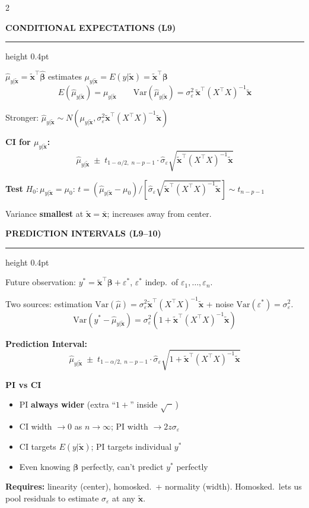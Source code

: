 \documentclass[7pt]{extarticle}
\newcommand{\msection}[1]{%
  \vspace{4pt}%
  {\small\bfseries\color{blue!70!black}\MakeUppercase{#1}}%
  \vspace{1pt}%
  \par\nobreak%
  {\color{blue!70!black}\hrule height 0.4pt}%
  \vspace{2pt}\par\nobreak%
}
\newcommand{\msubsection}[1]{%
  \vspace{2pt}%
  {\footnotesize\bfseries\color{purple!70!black}#1}%
  \vspace{1pt}\par\nobreak%
}
\newcommand{\bhat}{\hat{\bm{\beta}}}
\newcommand{\bvec}{\bm{\beta}}
\newcommand{\xt}{\tilde{\bm{x}}}
\newcommand{\sighat}{\hat{\sigma}_\varepsilon}
\newcommand{\sigeps}{\sigma_\varepsilon}
\newcommand{\XtX}{X^\top X}
\newcommand{\ep}{\varepsilon}
\begin{document}
\begin{multicols*}{2}

\msection{Conditional Expectations (L9)}

$\hat\mu_{y|\xt} = \xt^\top\bhat$ \;\; estimates \;\; $\mu_{y|\xt} = E(y|\xt) = \xt^\top\bvec$
\[
E(\hat\mu_{y|\xt}) = \mu_{y|\xt} \qquad \text{Var}(\hat\mu_{y|\xt}) = \sigeps^2\,\xt^\top(\XtX)^{-1}\xt
\]

Stronger: $\hat\mu_{y|\xt} \sim N(\mu_{y|\xt}, \sigeps^2\xt^\top(\XtX)^{-1}\xt)$

\textbf{CI for $\mu_{y|\xt}$:}
\[
\hat\mu_{y|\xt} \;\pm\; t_{1-\alpha/2,\;n-p-1}\cdot\sighat\sqrt{\xt^\top(\XtX)^{-1}\xt}
\]

\textbf{Test} $H_0\!: \mu_{y|\xt} = \mu_0$: \; $t = (\hat\mu_{y|\xt} - \mu_0)/[\sighat\sqrt{\xt^\top(\XtX)^{-1}\xt}] \sim t_{n-p-1}$

Variance \textbf{smallest} at $\xt = \bar{\bm{x}}$; increases away from center.

\msection{Prediction Intervals (L9--10)}

Future observation: $y^* = \xt^\top\bvec + \ep^*$, \;\; $\ep^*$ indep.\ of $\ep_1,\ldots,\ep_n$.

Two sources: estimation $\text{Var}(\hat\mu) = \sigeps^2\xt^\top(\XtX)^{-1}\xt$ + noise $\text{Var}(\ep^*) = \sigeps^2$.
\[
\text{Var}(y^*{-}\hat\mu_{y|\xt}) = \sigeps^2\!\left(1 + \xt^\top(\XtX)^{-1}\xt\right)
\]

\textbf{Prediction Interval:}
\[
\hat\mu_{y|\xt} \;\pm\; t_{1-\alpha/2,\;n-p-1}\cdot\sighat\sqrt{1+\xt^\top(\XtX)^{-1}\xt}
\]

\msubsection{PI vs CI}
\begin{itemize}
\item PI \textbf{always wider} (extra ``$1+$'' inside $\sqrt{\phantom{x}}$\,)
\item CI width $\to 0$ as $n\to\infty$; PI width $\to 2z\sigeps$
\item CI targets $E(y|\xt)$; PI targets individual $y^*$
\item Even knowing $\bvec$ perfectly, can't predict $y^*$ perfectly
\end{itemize}

\textbf{Requires:} linearity (center), homosked.\ + normality (width). Homosked.\ lets us pool residuals to estimate $\sigeps$ at any $\xt$.


\end{multicols*}
\end{document}
